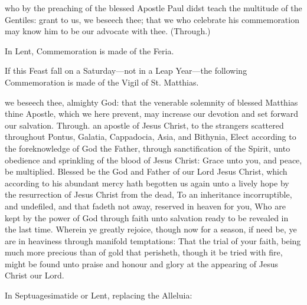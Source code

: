  who by the preaching of the blessed Apostle Paul didst teach the multitude of the Gentiles: grant to us, we beseech thee; that we who celebrate his commemoration may know him to be our advocate with thee. (Through.)
\begin{rubric}
    In Lent, Commemoration is made of the Feria.%
\end{rubric}
\begin{rubric}
    If this Feast fall on a Saturday---not in a Leap Year---the following Commemoration is made of the Vigil of St. Matthias.
\end{rubric}
 we beseech thee, almighty God: that the venerable solemnity of blessed Matthias thine Apostle, which we here prevent, may increase our devotion and set forward our salvation. Through.
 an apostle of Jesus Christ, to the strangers scattered throughout Pontus, Galatia, Cappadocia, Asia, and Bithynia, Elect according to the foreknowledge of God the Father, through sanctification of the Spirit, unto obedience and sprinkling of the blood of Jesus Christ: Grace unto you, and peace, be multiplied. Blessed be the God and Father of our Lord Jesus Christ, which according to his abundant mercy hath begotten us again unto a lively hope by the resurrection of Jesus Christ from the dead, To an inheritance incorruptible, and undefiled, and that fadeth not away, reserved in heaven for you, Who are kept by the power of God through faith unto salvation ready to be revealed in the last time. Wherein ye greatly rejoice, though now for a season, if need be, ye are in heaviness through manifold temptations: That the trial of your faith, being much more precious than of gold that perisheth, though it be tried with fire, might be found unto praise and honour and glory at the appearing of Jesus Christ our Lord.


\begin{rubric}
{In Septuagesimatide or Lent, replacing the Alleluia:}
\end{rubric}\par\noindent

